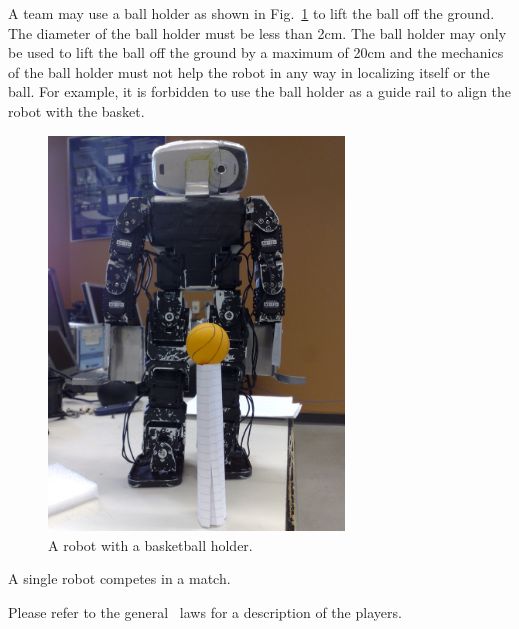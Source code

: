\documentclass[12pt]{hurocup}
\begin{document}
\begin{lawlist}[BB]
 \item A team may use a ball holder as shown in
   Fig.~\ref{fig:basketball-holder} to lift the ball off the
   ground. The diameter of the ball holder must be less than 2cm. The
   ball holder may only be used to lift the ball off the ground by a
   maximum of 20cm and the mechanics of the ball holder must not help
   the robot in any way in localizing itself or the ball. For example,
   it is forbidden to use the ball holder as a guide rail to align the
   robot with the basket.
  
 \begin{figure}
    \begin{center}
      \includegraphics[width=0.7\textwidth]{Figures/basketball-holder}
    \end{center}
    \caption{A robot with a basketball holder.}
    \label{fig:basketball-holder}
  \end{figure}

 \end{lawlist}


\begin{lawlist}[BB]
 \item A single robot competes in a match.
\end{lawlist}


Please refer to the general \HuroCup\ laws for a description of
the players.
\end{document}
